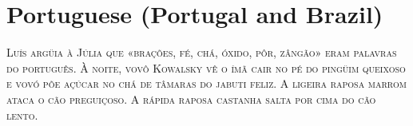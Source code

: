 

\presection\section*{\checkno Portuguese (Portugal and Brazil)}\postsection

\noindent\textsc{
Luís argüia à Júlia que «brações, fé, chá, óxido, pôr, zângão» 
eram palavras do português. 
À noite, vovô Kowalsky vê o ímã cair no pé do pingüim queixoso 
e vovó põe açúcar no chá de tâmaras do jabuti feliz. 
A ligeira raposa marrom ataca o cão preguiçoso.
A rápida raposa castanha salta por cima do cão lento.
}